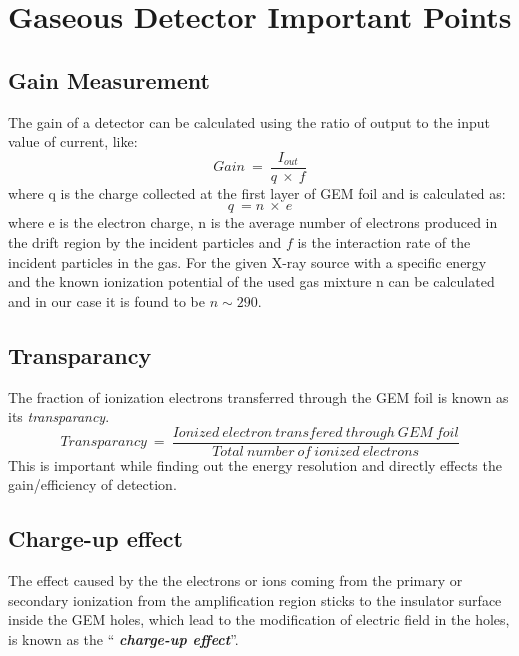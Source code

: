 \chapter{Gaseous Detector Important Points} %
\label{cha:gaseous_detector_important_points}

\section{Gain Measurement} %
\label{sec:gain_measurement}
The gain of a detector can be calculated using the ratio of output to the input value of current, like:
\begin{equation}
    Gain~=~\frac{I_{out}}{q~\times~f}
\end{equation}
where q is the charge collected at the first layer of GEM foil and is calculated as:
\begin{equation}
    q~= n~\times~e
\end{equation}
where e is the electron charge, n is the average number of electrons produced in the drift region by the incident particles and $f$ is the interaction rate of the incident particles in the gas. For the given X-ray source with a specific energy and the known ionization potential of the used gas mixture n can be calculated and in our case it is found to be $n \sim 290$.

\section{Transparancy} %
\label{sec:transparancy}
The fraction of ionization electrons transferred through the GEM foil is known as its \textit{transparancy}. 
\begin{equation}
	Transparancy~=~\frac{Ionized~electron~transfered~through~GEM~foil}{Total~number~of~ionized~electrons}
\end{equation}
This is important while finding out the energy resolution and directly effects the gain/efficiency of detection.

\section{Charge-up effect} %
\label{sec:charge_up_effect}

The effect caused by the the electrons or ions coming from the primary or secondary ionization from the amplification region sticks to the insulator surface inside the GEM holes, which lead to the modification of electric field in the holes, is known as the ``\textit{ \textbf{charge-up effect}}''.

